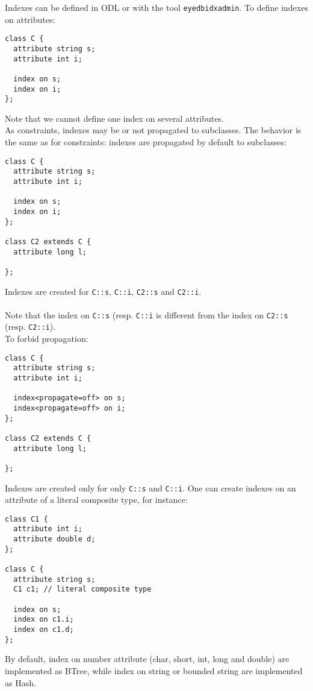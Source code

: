 Indexes can be defined in ODL or with the tool \texttt{eyedbidxadmin}.
To define indexes on attributes:
\begin{verbatim}
class C {
  attribute string s;
  attribute int i;

  index on s;
  index on i;
};
\end{verbatim}
Note that we cannot define one index on several attributes.
\\
As constraints, indexes may be or not propagated to subclasses.
The behavior is the same as for constraints: indexes are propagated
by default to subclasses:
\begin{verbatim}
class C {
  attribute string s;
  attribute int i;

  index on s;
  index on i;
};

class C2 extends C {
  attribute long l;
  
};
\end{verbatim}
Indexes are created for \texttt{C::s}, \texttt{C::i}, \texttt{C2::s}
and \texttt{C2::i}.
\\
\\
Note that the index on \texttt{C::s} (resp. \texttt{C::i} is different from the
index on \texttt{C2::s} (resp. \texttt{C2::i}).
\\
To forbid propagation:
\begin{verbatim}
class C {
  attribute string s;
  attribute int i;

  index<propagate=off> on s;
  index<propagate=off> on i;
};

class C2 extends C {
  attribute long l;
  
};
\end{verbatim}
Indexes are created only for only \texttt{C::s} and \texttt{C::i}.
One can create indexes on an attribute of a literal composite type, for
instance:
\begin{verbatim}
class C1 {
  attribute int i;
  attribute double d;
};

class C {
  attribute string s;
  C1 c1; // literal composite type

  index on s;
  index on c1.i;
  index on c1.d;
};
\end{verbatim}
By default, index on number attribute (char, short, int, long and double)
are implemented as BTree, while index on string or bounded string are
implemented as Hash.
\\
